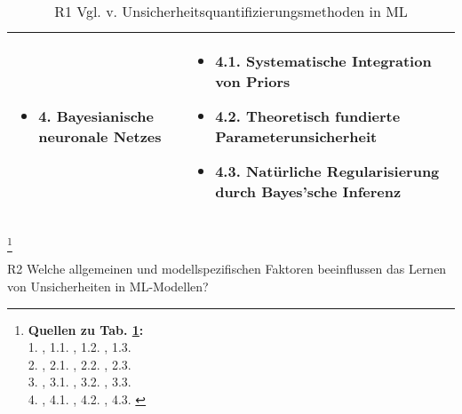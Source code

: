 \begin{otherlanguage}{ngerman}
\begin{table}[!htpb]
\begin{tabularx}{\textwidth}{|l|X|}
    \hline
    \begin{itemize}[topsep=0em, itemsep=0em, left=0em, labelsep=0.25em]
      \item 4. \gls{Bayesianische neuronale Netze}s
    \end{itemize} & 
    \begin{itemize}[topsep=0em, itemsep=0em, left=0em, labelsep=0.25em]
      \item 4.1. Systematische Integration von Priors
      \item 4.2. Theoretisch fundierte Parameterunsicherheit
      \item 4.3. Natürliche Regularisierung durch Bayes'sche Inferenz
    \end{itemize} \\
    \hline
  \end{tabularx}
  \caption{R1 Vgl. v. Unsicherheitsquantifizierungsmethoden in ML}
  \label{tab:chapter6r1}
\end{table}

\footnote{%
\begin{minipage}[t]{\textwidth}
\scriptsize
\textbf{Quellen zu Tab. \ref{tab:chapter6r1}:}\\
1. \parencite[Kap.~2]{rasmussen2006gaussian}, 
1.1. \parencite[S.~16–17]{rasmussen2006gaussian}, 
1.2. \parencite[Kap.~2.2]{rasmussen2006gaussian},
1.3. \parencite[Kap.~4]{rasmussen2006gaussian}\\[0.3em]
2. \parencite{lakshminarayanan2017simple},
2.1. \parencite[S.~3]{lakshminarayanan2017simple},
2.2. \parencite[S.~5]{lakshminarayanan2017simple},
2.3. \parencite{ovadia2019can}\\[0.3em]
3. \parencite{perdikaris2017nonlinear}, 
3.1. \parencite[S.~5–6]{perdikaris2017nonlinear},
3.2. \parencite[S.~6]{perdikaris2017nonlinear},
3.3. \parencite{liu2020multifidelity}\\[0.3em]
4. \parencite{gal2016uncertainty}, 
4.1. \parencite[Kap.~2.3]{gal2016uncertainty}, 
4.2. \parencite[S.~40–41]{gal2016uncertainty}, 
4.3. \parencite[S.~41–42]{gal2016uncertainty}
\end{minipage}%
}


\newpage


R2 Welche allgemeinen und modellspezifischen Faktoren beeinflussen das Lernen von Unsicherheiten in ML-Modellen?


\end{otherlanguage}

